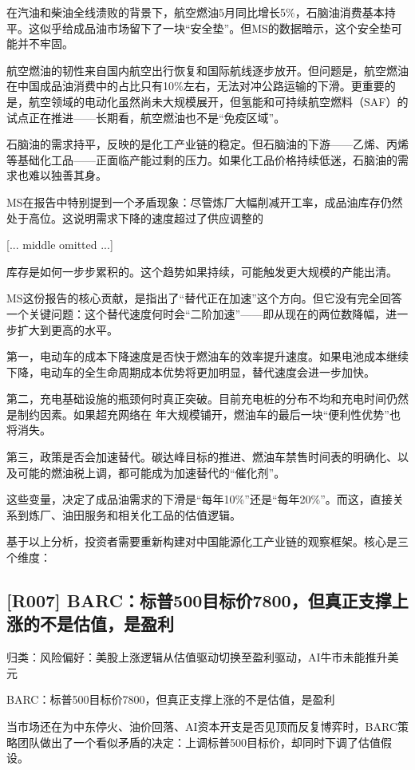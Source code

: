\documentclass[11pt]{ctexart}
\begin{document}
在汽油和柴油全线溃败的背景下，航空燃油5月同比增长5\%，石脑油消费基本持平。这似乎给成品油市场留下了一块“安全垫”。但MS的数据暗示，这个安全垫可能并不牢固。

航空燃油的韧性来自国内航空出行恢复和国际航线逐步放开。但问题是，航空燃油在中国成品油消费中的占比只有10\%左右，无法对冲公路运输的下滑。更重要的是，航空领域的电动化虽然尚未大规模展开，但氢能和可持续航空燃料（SAF）的试点正在推进——长期看，航空燃油也不是“免疫区域”。

石脑油的需求持平，反映的是化工产业链的稳定。但石脑油的下游——乙烯、丙烯等基础化工品——正面临产能过剩的压力。如果化工品价格持续低迷，石脑油的需求也难以独善其身。

MS在报告中特别提到一个矛盾现象：尽管炼厂大幅削减开工率，成品油库存仍然处于高位。这说明需求下降的速度超过了供应调整的

[... middle omitted ...]

库存是如何一步步累积的。这个趋势如果持续，可能触发更大规模的产能出清。

MS这份报告的核心贡献，是指出了“替代正在加速”这个方向。但它没有完全回答一个关键问题：这个替代速度何时会“二阶加速”——即从现在的两位数降幅，进一步扩大到更高的水平。

第一，电动车的成本下降速度是否快于燃油车的效率提升速度。如果电池成本继续下降，电动车的全生命周期成本优势将更加明显，替代速度会进一步加快。

第二，充电基础设施的瓶颈何时真正突破。目前充电桩的分布不均和充电时间仍然是制约因素。如果超充网络在 年大规模铺开，燃油车的最后一块“便利性优势”也将消失。

第三，政策是否会加速替代。碳达峰目标的推进、燃油车禁售时间表的明确化、以及可能的燃油税上调，都可能成为加速替代的“催化剂”。

这些变量，决定了成品油需求的下滑是“每年10\%”还是“每年20\%”。而这，直接关系到炼厂、油田服务和相关化工品的估值逻辑。

基于以上分析，投资者需要重新构建对中国能源化工产业链的观察框架。核心是三个维度：

\subsection{[R007] BARC：标普500目标价7800，但真正支撑上涨的不是估值，是盈利}
{\small\color{refgray}归类：风险偏好：美股上涨逻辑从估值驱动切换至盈利驱动，AI牛市未能推升美元}

BARC：标普500目标价7800，但真正支撑上涨的不是估值，是盈利

当市场还在为中东停火、油价回落、AI资本开支是否见顶而反复博弈时，BARC策略团队做出了一个看似矛盾的决定：上调标普500目标价，却同时下调了估值假设。
\end{document}
